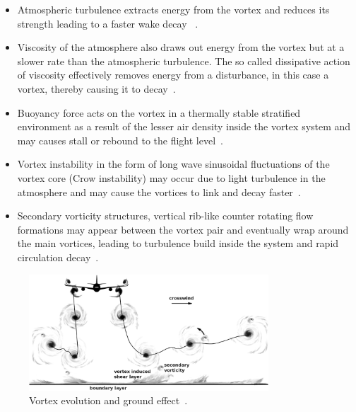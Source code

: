 \begin{itemize}
    \item Atmospheric turbulence extracts energy from the vortex and reduces its strength leading to a faster wake decay ~\cite{Hallock2018Apr}.
    \item Viscosity of the atmosphere also draws out energy from the vortex but at a slower rate than the atmospheric turbulence. The so called dissipative action of viscosity  effectively removes energy from a disturbance, in this case a vortex, thereby causing it to decay~\cite{Hallock2018Apr, houghton2012aerodynamics}.
    \item Buoyancy force acts on the vortex in a thermally stable stratified environment as a result of the lesser air density inside the vortex system and may causes stall or rebound to the flight level~\cite{Holzapfel2001Feb, gerz_commercial_2002}.
    \item Vortex instability in the form of long wave sinusoidal fluctuations of the vortex core (Crow instability) may occur due to light turbulence in the atmosphere and may cause the vortices to link and decay faster~\cite{dup._donamdson_vortex_1975, Hallock2018Apr, crow2003stability}.
    \item Secondary vorticity structures, vertical rib-like counter rotating flow formations may appear between the vortex pair and eventually wrap around the main vortices, leading to turbulence build inside the system and rapid circulation decay~\cite{Holzapfel2001Feb, Holzapfel2003Jun}.
\end{itemize}
\begin{figure}[h]
    \centering
    \includegraphics[width=0.8\textwidth]{graphics/Hallock_vortex_evolution.jpg}
    \caption[Wake vortex and ground effect]{Vortex evolution and ground effect~\cite[p.~29]{Hallock2018Apr}.} \label{fig:vortex_ground_effect}
\end{figure}


